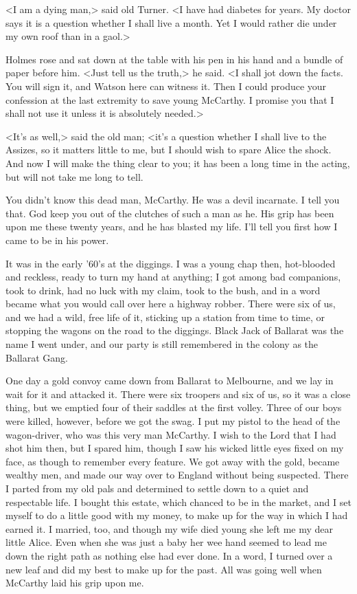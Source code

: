 <I am a dying man,> said old Turner. <I have had diabetes for years. My doctor says it is a question whether I shall live a month. Yet I would rather die under my own roof than in a gaol.>

Holmes rose and sat down at the table with his pen in his hand and a bundle of paper before him. <Just tell us the truth,> he said. <I shall jot down the facts. You will sign it, and Watson here can witness it. Then I could produce your confession at the last extremity to save young McCarthy. I promise you that I shall not use it unless it is absolutely needed.>

<It's as well,> said the old man; <it's a question whether I shall live to the Assizes, so it matters little to me, but I should wish to spare Alice the shock. And now I will make the thing clear to you; it has been a long time in the acting, but will not take me long to tell.

You didn't know this dead man, McCarthy. He was a devil incarnate. I tell you that. God keep you out of the clutches of such a man as he. His grip has been upon me these twenty years, and he has blasted my life. I'll tell you first how I came to be in his power.

It was in the early '60's at the diggings. I was a young chap then, hot-blooded and reckless, ready to turn my hand at anything; I got among bad companions, took to drink, had no luck with my claim, took to the bush, and in a word became what you would call over here a highway robber. There were six of us, and we had a wild, free life of it, sticking up a station from time to time, or stopping the wagons on the road to the diggings. Black Jack of Ballarat was the name I went under, and our party is still remembered in the colony as the Ballarat Gang.

One day a gold convoy came down from Ballarat to Melbourne, and we lay in wait for it and attacked it. There were six troopers and six of us, so it was a close thing, but we emptied four of their saddles at the first volley. Three of our boys were killed, however, before we got the swag. I put my pistol to the head of the wagon-driver, who was this very man McCarthy. I wish to the Lord that I had shot him then, but I spared him, though I saw his wicked little eyes fixed on my face, as though to remember every feature. We got away with the gold, became wealthy men, and made our way over to England without being suspected. There I parted from my old pals and determined to settle down to a quiet and respectable life. I bought this estate, which chanced to be in the market, and I set myself to do a little good with my money, to make up for the way in which I had earned it. I married, too, and though my wife died young she left me my dear little Alice. Even when she was just a baby her wee hand seemed to lead me down the right path as nothing else had ever done. In a word, I turned over a new leaf and did my best to make up for the past. All was going well when McCarthy laid his grip upon me.

